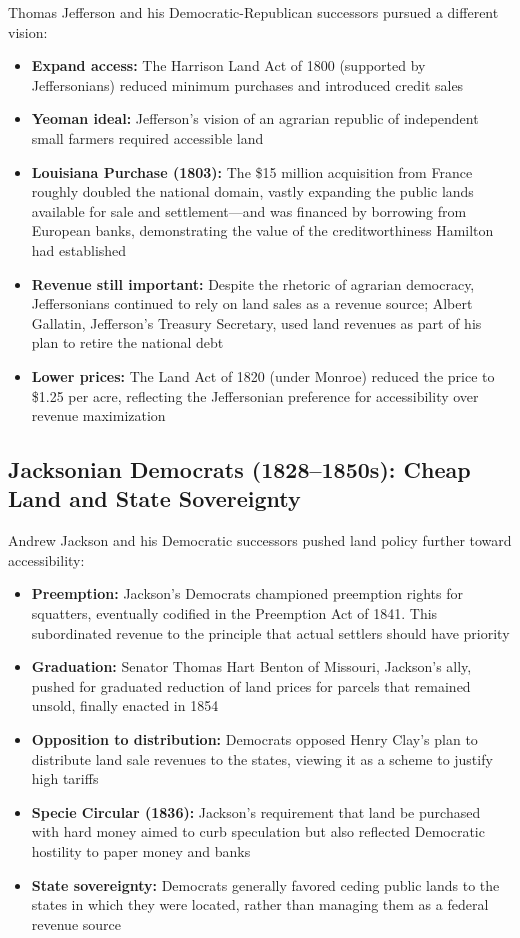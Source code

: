 \documentclass[12pt]{article}
\begin{document}
Thomas Jefferson and his Democratic-Republican successors pursued a different vision:

\begin{itemize}
\item \textbf{Expand access:} The Harrison Land Act of 1800 (supported by Jeffersonians) reduced minimum purchases and introduced credit sales
\item \textbf{Yeoman ideal:} Jefferson's vision of an agrarian republic of independent small farmers required accessible land
\item \textbf{Louisiana Purchase (1803):} The \$15 million acquisition from France roughly doubled the national domain, vastly expanding the public lands available for sale and settlement---and was financed by borrowing from European banks, demonstrating the value of the creditworthiness Hamilton had established
\item \textbf{Revenue still important:} Despite the rhetoric of agrarian democracy, Jeffersonians continued to rely on land sales as a revenue source; Albert Gallatin, Jefferson's Treasury Secretary, used land revenues as part of his plan to retire the national debt
\item \textbf{Lower prices:} The Land Act of 1820 (under Monroe) reduced the price to \$1.25 per acre, reflecting the Jeffersonian preference for accessibility over revenue maximization
\end{itemize}

\subsection{Jacksonian Democrats (1828--1850s): Cheap Land and State Sovereignty}

Andrew Jackson and his Democratic successors pushed land policy further toward accessibility:

\begin{itemize}
\item \textbf{Preemption:} Jackson's Democrats championed preemption rights for squatters, eventually codified in the Preemption Act of 1841.  This subordinated revenue to the principle that actual settlers should have priority
\item \textbf{Graduation:} Senator Thomas Hart Benton of Missouri, Jackson's ally, pushed for graduated reduction of land prices for parcels that remained unsold, finally enacted in 1854
\item \textbf{Opposition to distribution:} Democrats opposed Henry Clay's plan to distribute land sale revenues to the states, viewing it as a scheme to justify high tariffs
\item \textbf{Specie Circular (1836):} Jackson's requirement that land be purchased with hard money aimed to curb speculation but also reflected Democratic hostility to paper money and banks
\item \textbf{State sovereignty:} Democrats generally favored ceding public lands to the states in which they were located, rather than managing them as a federal revenue source
\end{itemize}
\end{document}
